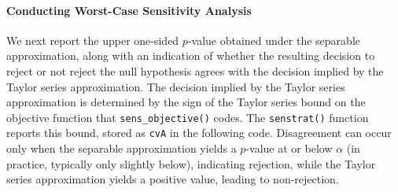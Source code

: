 \documentclass[
  12pt,
  leqno]{article}
\begin{document}
\paragraph{Conducting Worst-Case Sensitivity
Analysis}\label{conducting-worst-case-sensitivity-analysis}

We next report the upper one-sided \(p\)-value obtained under the
separable approximation, along with an indication of whether the
resulting decision to reject or not reject the null hypothesis agrees
with the decision implied by the Taylor series approximation. The
decision implied by the Taylor series approximation is determined by the
sign of the Taylor series bound on the objective function that
\texttt{sens\_objective()} codes. The \texttt{senstrat()} function
reports this bound, stored as \texttt{cvA} in the following code.
Disagreement can occur only when the separable approximation yields a
\(p\)-value at or below \(\alpha\) (in practice, typically only slightly
below), indicating rejection, while the Taylor series approximation
yields a positive value, leading to non-rejection.

\singlespacing
\end{document}
